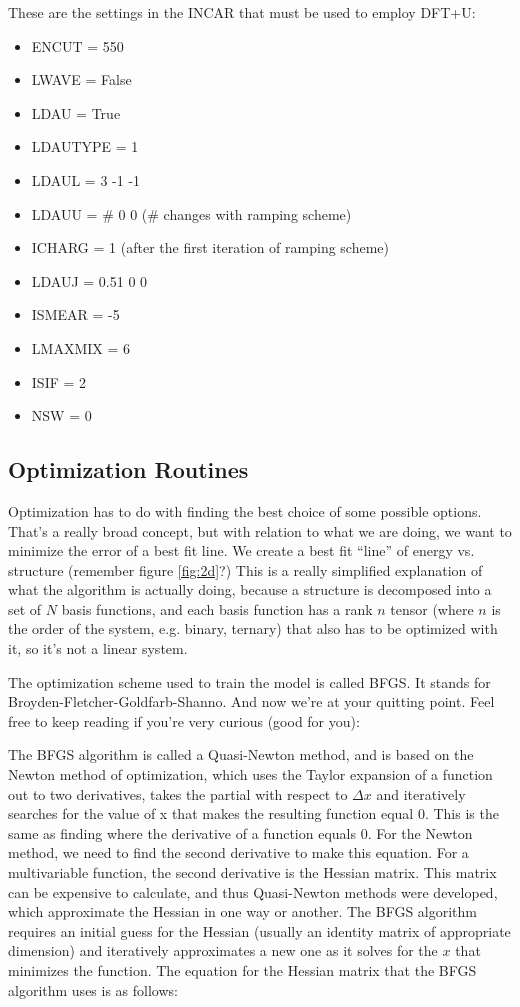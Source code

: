 \documentclass{article}
\begin{document}
These are the settings in the INCAR that must be used to employ DFT+U:
\begin{itemize}
  \item{ENCUT = 550 }
  \item{LWAVE = False }
  \item{ LDAU = True }
  \item{ LDAUTYPE = 1 }
  \item{ LDAUL = 3 -1 -1 }
  \item{ LDAUU = \# 0 0 (\# changes with ramping scheme)}
  \item{ ICHARG = 1 (after the first iteration of ramping scheme)}
  \item{ LDAUJ = 0.51 0 0 }
  \item{ ISMEAR = -5 }
  \item{ LMAXMIX = 6 }
  \item{ ISIF = 2 }
  \item{ NSW = 0 }
\end{itemize}

\subsection{Optimization Routines}
Optimization has to do with finding the best choice of some possible
options. That's a really broad concept, but with relation to what we
are doing, we want to minimize the error of a best fit line. We create
a best fit ``line'' of energy vs. structure (remember figure
\ref{fig:2d}?) This is a really simplified explanation of what the
algorithm is actually doing, because a structure is decomposed into a
set of $N$ basis functions, and each basis function has a rank $n$ tensor
(where $n$ is the order of the system, e.g. binary, ternary) that also
has to be optimized with it, so it's not a linear system. 

The optimization scheme used to train the model is called BFGS. It
stands for Broyden-Fletcher-Goldfarb-Shanno. And now we're at your
quitting point. Feel free to keep reading if you're very curious (good
for you):

The BFGS algorithm is called a Quasi-Newton method, and is
based on the Newton method of optimization, which uses the Taylor
expansion of a function out to two derivatives, takes the partial with
respect to $ \Delta x $ and iteratively searches for the value of x that
makes the resulting function equal 0. This is the same as finding
where the derivative of a function equals 0. For the Newton method, we
need to find the second derivative to make this equation. For a
multivariable function, the second derivative is the Hessian
matrix. This matrix can be expensive to calculate, and thus
Quasi-Newton methods were developed, which approximate the Hessian in
one way or another. The BFGS algorithm requires an initial guess for 
the Hessian (usually an identity matrix of appropriate dimension) and
iteratively approximates a new one as it solves for the $x$ that
minimizes the function. The equation for the Hessian matrix that the
BFGS algorithm uses is as follows:
\end{document}
